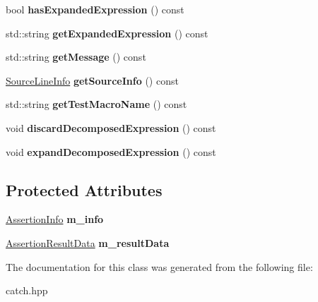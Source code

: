 \begin{DoxyCompactItemize}
bool {\bfseries has\+Expanded\+Expression} () const
\item 
\mbox{\label{classCatch_1_1AssertionResult_aaa46070791a6c07caaed86229b8d9d75}} 
std\+::string {\bfseries get\+Expanded\+Expression} () const
\item 
\mbox{\label{classCatch_1_1AssertionResult_ae730943beed46921b09383c673e35786}} 
std\+::string {\bfseries get\+Message} () const
\item 
\mbox{\label{classCatch_1_1AssertionResult_aa4d3fdbfe276a69a035762dbb790800f}} 
\hyperlink{structCatch_1_1SourceLineInfo}{Source\+Line\+Info} {\bfseries get\+Source\+Info} () const
\item 
\mbox{\label{classCatch_1_1AssertionResult_aaefd9a0384282fd08a4a72aa19bd0628}} 
std\+::string {\bfseries get\+Test\+Macro\+Name} () const
\item 
\mbox{\label{classCatch_1_1AssertionResult_a406884d8b8209c80078706724c528df5}} 
void {\bfseries discard\+Decomposed\+Expression} () const
\item 
\mbox{\label{classCatch_1_1AssertionResult_ac0b1d268a3ffa1f1fb305cad9435d824}} 
void {\bfseries expand\+Decomposed\+Expression} () const
\end{DoxyCompactItemize}
\subsection*{Protected Attributes}
\begin{DoxyCompactItemize}
\item 
\mbox{\label{classCatch_1_1AssertionResult_a3e7236f73a51d6fc8bb9dfdefcee7772}} 
\hyperlink{structCatch_1_1AssertionInfo}{Assertion\+Info} {\bfseries m\+\_\+info}
\item 
\mbox{\label{classCatch_1_1AssertionResult_add3455b8bbedb0d643e18da67c66b4f7}} 
\hyperlink{structCatch_1_1AssertionResultData}{Assertion\+Result\+Data} {\bfseries m\+\_\+result\+Data}
\end{DoxyCompactItemize}


The documentation for this class was generated from the following file\+:\begin{DoxyCompactItemize}
\item 
catch.\+hpp\end{DoxyCompactItemize}
